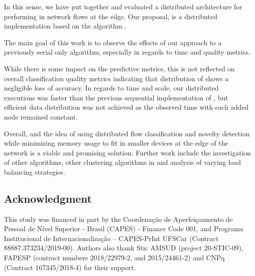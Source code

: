 In this sense, we have put together and evaluated a distributed architecture for performing \nd in network flows at the edge.
Our proposal, \mfog is a distributed \nd
implementation based on the \nd algorithm \minas.

The main goal of this work is to observe the effects of our approach to a
previously serial only algorithm, especially in regards to time and quality
metrics.

While there is some impact on the predictive metrics, this is not reflected on
overall classification quality metrics indicating that distribution of \minas
shows a negligible loss of accuracy.
In regards to time and scale, our distributed executions was faster than the 
previous sequential implementation of \minas, but efficient data distribution was not achieved as the
observed time with each added node remained constant.

Overall, \mfog and the idea of using distributed flow classification and novelty
detection while minimizing memory usage to fit in smaller devices at the edge of
the network is a viable and promising solution.
Further work include the investigation of other \nd algorithms, other clustering
algorithms in \minas and analysis of varying load balancing strategies.

\subsection*{Acknowledgment}

This study was financed in part by the Coordenação de Aperfeiçoamento de Pessoal de
Nível Superior - Brasil (CAPES) - Finance Code 001,
and Programa Institucional de Internacionalização – CAPES-PrInt UFSCar (Contract 88887.373234/2019-00). 
Authors also thank Stic AMSUD (project 20-STIC-09), FAPESP (contract numbers  2018/22979-2, and 2015/24461-2) and CNPq (Contract 167345/2018-4) for their support.
